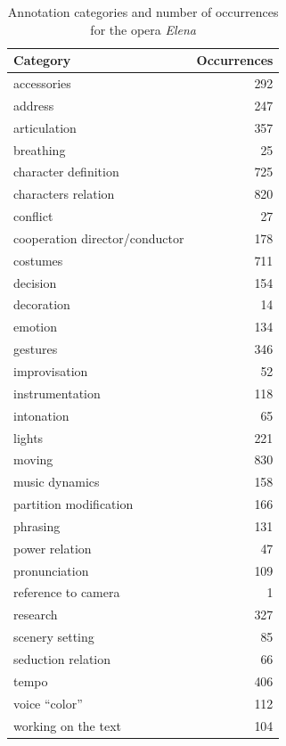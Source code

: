 \documentclass[conference]{IEEEtran}
\begin{document}
\begin{table}
\centering
\small
\begin{tabular}{|p{6cm}|r|}
\hline 
Category & Occurrences \\ 
\hline 
accessories & 292 \\ 
\hline 
address & 247 \\ 
\hline 
articulation & 357 \\ 
\hline 
breathing & 25 \\ 
\hline 
character definition & 725 \\ 
\hline 
characters relation & 820 \\ 
\hline 
conflict & 27 \\ 
\hline 
cooperation director/conductor & 178 \\ 
\hline 
costumes & 711 \\ 
\hline 
decision & 154 \\ 
\hline 
decoration & 14 \\ 
\hline 
emotion & 134 \\ 
\hline 
gestures & 346 \\ 
\hline 
improvisation & 52 \\ 
\hline 
instrumentation & 118 \\ 
\hline 
intonation & 65 \\ 
\hline 
lights & 221 \\ 
\hline 
moving & 830 \\ 
\hline 
music dynamics & 158 \\ 
\hline 
partition modification & 166 \\ 
\hline 
phrasing & 131 \\ 
\hline 
power relation & 47 \\ 
\hline 
pronunciation & 109 \\ 
\hline 
reference to camera & 1 \\ 
\hline 
research & 327 \\ 
\hline 
scenery setting & 85 \\ 
\hline 
seduction relation & 66 \\ 
\hline 
tempo & 406 \\ 
\hline 
voice ``color'' & 112 \\ 
\hline 
working on the text & 104 \\ 
\hline 
\end{tabular} 
\caption{Annotation categories and number of occurrences for the opera \emph{Elena}}
\label{table:categories2}
\end{table}  
 
\end{document}
